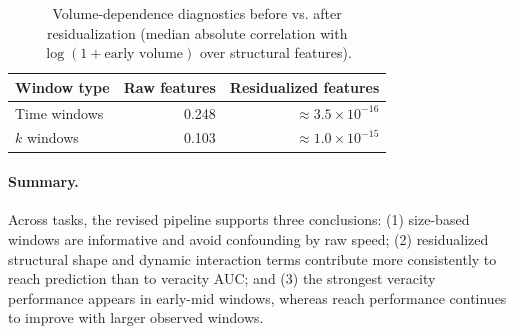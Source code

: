 \begin{table}[!htbp]
  \centering
  \caption{Volume-dependence diagnostics before vs. after residualization (median absolute correlation with $\log(1+\text{early volume})$ over structural features).}
  \label{tab:residualization_diag}
  \begin{tabular}{lrr}
    \toprule
    Window type & Raw features & Residualized features \\
    \midrule
    Time windows & 0.248 & $\approx 3.5\times10^{-16}$ \\
    $k$ windows  & 0.103 & $\approx 1.0\times10^{-15}$ \\
    \bottomrule
  \end{tabular}
\end{table}
\FloatBarrier

\paragraph{Summary.}
Across tasks, the revised pipeline supports three conclusions: (1) size-based windows are informative and avoid confounding by raw speed; (2) residualized structural shape and dynamic interaction terms contribute more consistently to reach prediction than to veracity AUC; and (3) the strongest veracity performance appears in early-mid windows, whereas reach performance continues to improve with larger observed windows.
